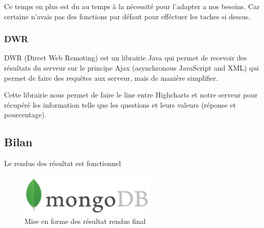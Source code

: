 Ce temps en plus est du au temps à la nécessité pour l'adapter a nos besoins. Car certaine n'avais pas des fonctions par défaut pour efféctuer les taches si dessus.

\subsubsection{DWR}

DWR (Direct Web Remoting) est un librairie Java qui permet de recevoir des résultats du serveur sur le principe Ajax (asynchronous JavaScript and XML) qui permet de faire des requêtes aux serveur, mais de manière simplifier.

Cette librairie nous permet de faire le line entre Highcharts et notre serveur pour récupéré les information telle que les questions et leurs valeurs (réponse et pourcentage).

\subsection{Bilan}

Le rendus des résultat est fonctionnel 

\begin{figure}[H]
    \begin{center}
    \includegraphics[height=2.0cm]{img/mongodb}
    \end{center}
    \caption{Mise en forme des résultat rendus final}
\end{figure}